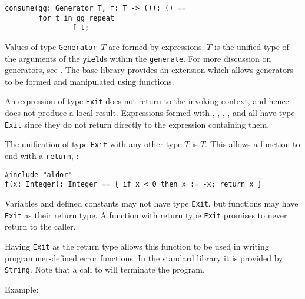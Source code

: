 \begin{small}%
\begin{verbatim}
consume(gg: Generator T, f: T -> ()): () ==
        for t in gg repeat
                f t;
\end{verbatim}
\end{small}

Values of type {\tt Generator $T$} 
are formed by  expressions.
$T$ is the unified type of the arguments of the {\tt yield}s within the
{\tt generate}.
For more discussion on generators, see .
The base \asharp{} library provides an extension which
allows generators to be formed and manipulated using functions.

An expression of type \verb+Exit+ does not return to the invoking
context, and hence does not produce a local result.
Expressions formed with 
,    
,     
,  
,    
    
and  
all have type \verb+Exit+ since they do not return directly to the 
expression containing them.

The unification of type \verb+Exit+ with any other type $T$ is $T$.
This allows a function to end with a \verb+return+, \eg{}:

\begin{small}%
\begin{verbatim}
#include "aldor"
f(x: Integer): Integer == { if x < 0 then x := -x; return x }
\end{verbatim}
\end{small}

Variables and defined constants may not
have type \verb+Exit+, but functions may have \verb+Exit+ as their
return type.  
A function with return type \verb+Exit+ promises
to never return to the caller.  

Having \verb"Exit" as the return type allows this function
to be used in writing programmer-defined error functions.  In the
standard \asharp{} library it is provided by {\tt String}.  Note that a
call to  will terminate the program.

Example:

